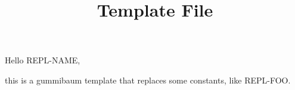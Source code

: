 \documentclass[a4paper]{scrartcl}
\title{Template File}
\begin{document}
\maketitle

Hello REPL-NAME,

this is a gummibaum template that replaces some constants, like REPL-FOO.

\end{document}
